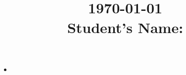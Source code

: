 \documentclass[12pt, a4paper, addpoints]{exam}
\title{\large 

\\ \dayofweekname{\day}{\month}{\year} \today \\ \vspace{2mm} \quad Student's Name: \underline{\hspace{8cm}}}
\date{}
\begin{document}
\maketitle

\LARGE
\noindent 


\begin{mdframed}[backgroundcolor=gray!10]
    \begin{multicols}{2}
        \large
        \begin{itemize}
            \item 
        \end{itemize}
    \end{multicols}
\end{mdframed}

   \LARGE
    \tableofcontents
\newpage

\begin{questions}
    
 \newpage


    
 \newpage


  
\end{questions}
\end{document}
